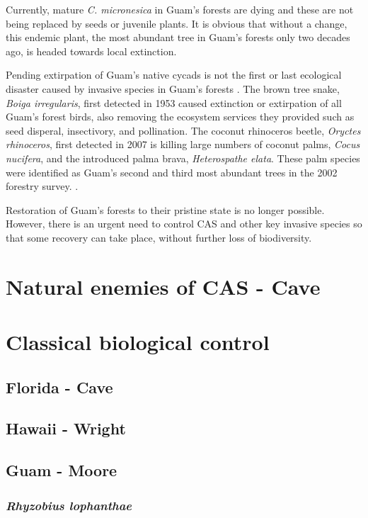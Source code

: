 \documentclass[12pt,letterpaper,english,bibliography=totocnumbered, abstract=on]{scrartcl}
\begin{document}
Currently, mature \textit{C. micronesica} in Guam's forests are dying and these are not being replaced by seeds or juvenile plants. It is obvious that without a change, this endemic plant, the most abundant tree in Guam's forests only two decades ago, is headed towards local extinction.

Pending extirpation of Guam's native cycads is not the first or last ecological disaster caused by invasive species in Guam's forests \parencite{moore_failed_2018}. The brown tree snake, \textit{Boiga irregularis}, first detected in 1953 caused extinction or extirpation of all Guam's forest birds, also removing the ecosystem services they provided such as seed disperal, insectivory, and pollination. The coconut rhinoceros beetle, \textit{Oryctes rhinoceros}, first detected in 2007 is killing large numbers of coconut palms, \textit{Cocus nucifera}, and the introduced palma brava, \textit{Heterospathe elata}. These palm species were identified as Guam's second and third most abundant trees in the 2002 forestry survey. \parencite{donnegon_guams_2004}.

Restoration of Guam's forests to their pristine state is no longer possible. However, there is an urgent need to control CAS and other key invasive species so that some recovery can take place, without further loss of biodiversity. 

\section{Natural enemies of CAS - Cave}

\section{Classical biological control}

\subsection{Florida - Cave}

\subsection{Hawaii - Wright}

\subsection{Guam - Moore}

\subsubsection{\textit{Rhyzobius lophanthae}}
\end{document}
